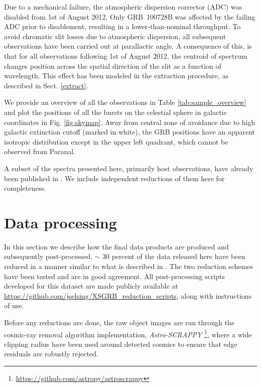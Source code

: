 \documentclass{aa}    %
\begin{document}
Due to a mechanical failure, the atmospheric dispersion corrector (ADC) was
disabled from 1st of August 2012. Only GRB~100728B was affected by the failing
ADC prior to disablement, resulting in a lower-than-nominal throughput. To avoid
chromatic slit losses due to atmospheric dispersion, all subsequent observations
have been carried out at parallactic angle. A consequence of this, is that for
all observations following 1st of August 2012, the centroid of spectrum changes
position across the spatial direction of the slit as a function of wavelength.
This effect has been modeled in the extraction procedure, as described in Sect. 
\ref{extract}.



We provide an overview of all the observations in Table
\ref{tab:sample_overview} and plot the positions of all the bursts on the
celestial sphere in galactic coordinates in Fig. \ref{fig:skymap}. Away from
central zone of avoidance due to high galactic extinction cutoff (marked in
white), the GRB positions have an apparent isotropic distribution except in the
upper left quadrant, which cannot be observed from Paranal.

A subset of the spectra presented here, primarily host observations, have
already been published in \citet{Kruhler2015}. We include independent
reductions of them here for completeness.

\section{Data processing} \label{proc}

In this section we describe how the final data products are produced and
subsequently post-processed. $\sim$ 30 percent of the data released here have
been reduced in a manner similar to what is described in \citet{Kruhler2015}.
The two reduction schemes have been tested and are in good agreement. All
post-processing scripts developed for this dataset are made publicly available
at \url{https://github.com/jselsing/XSGRB_reduction_scripts}, along with
instructions of use.

Before any reductions are done, the raw object images are run through the
cosmic-ray removal algorithm \citep{VanDokkum2001} implementation,
\textit{Astro-SCRAPPY} \footnote{\url{https://github.com/astropy/astroscrappy}},
where a wide clipping radius have been used around detected cosmics to ensure that edge residuals are
robustly rejected. 
\end{document}
